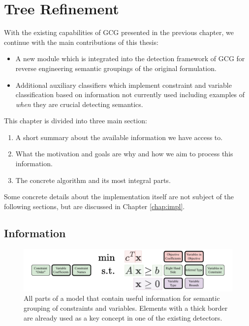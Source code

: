 \chapter{Tree Refinement}
\label{chap:tree}

	With the existing capabilities of \ac{GCG} presented in the previous chapter, we continue with the main contributions of this thesis:
	
	\begin{itemize}
		\item A new module which is integrated into the detection framework of \ac{GCG} for reverse engineering semantic groupings of the original formulation.
		\item Additional auxiliary classifiers which implement constraint and variable classification based on information not currently used including examples of \textit{when} they are crucial detecting semantics.
	\end{itemize}

	This chapter is divided into three main section:
	
	\begin{enumerate}
		\item A short summary about the available information we have access to.
		\item What the motivation and goals are why and how we aim to process this information.
		\item The concrete algorithm and its most integral parts.
	\end{enumerate}
	
	Some concrete details about the implementation itself are not subject of the following sections, but are discussed in Chapter \ref{chap:impl}.

	\clearpage

	\section{Information}
	
	\begin{figure}[ht!]
		\centering
		\includegraphics[scale=0.8]{Bilder/DrawIO/model_information}
		\caption{All parts of a model that contain useful information for semantic grouping of constraints and variables. Elements with a thick border are already used as a key concept in one of the existing detectors.}
		\label{fig:tree:information}
	\end{figure}
	
